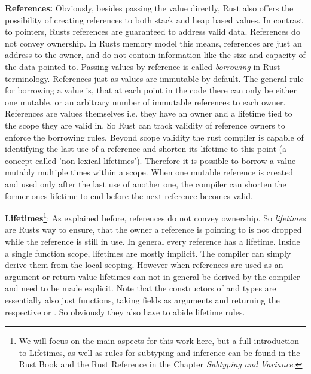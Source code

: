\textbf{References:} Obviously, besides passing the value directly, Rust also offers the possibility of creating references to both stack and heap based values. In contrast to pointers, Rusts references are guaranteed to address valid data. References do not convey ownership. In Rusts memory model this means, references are just an address to the owner, and do not contain information like the size and capacity of the data pointed to. Passing values by reference is called \emph{borrowing} in Rust terminology. References just as  values are immutable by default. The general rule for borrowing a value is, that at each point in the code there can only be either one mutable, or an arbitrary number of immutable references to each owner. References are values themselves i.e. they have an owner and a lifetime tied to the scope they are valid in. So Rust can track validity of reference owners to enforce the borrowing rules. Beyond scope validity the rust compiler is capable of identifying the last use of a reference and shorten its lifetime to this point (a concept called 'non-lexical lifetimes'). Therefore it is possible to borrow a value mutably multiple times within a scope. When one mutable reference is created and used only after the last use of another one, the compiler can shorten the former ones lifetime to end before the next reference becomes valid. 

\textbf{Lifetimes}\footnote{ We will focus on the main aspects for this work here, but a full introduction to Lifetimes, as well as rules for subtyping and inference can be found in the Rust Book\cite{rustbook} and the Rust Reference\cite{rustreference} in the Chapter \emph{Subtyping and Variance}.}: As explained before, references do not convey ownership. So \emph{lifetimes} are Rusts way to ensure, that the owner a reference is pointing to is not dropped while the reference is still in use. 
In general every reference has a lifetime. Inside a single function scope, lifetimes are mostly implicit. The compiler can simply derive them from the local scoping. However when references are used as an argument or return value lifetimes can not in general be derived by the compiler and need to be made explicit. Note that the constructors of  and  types are essentially also just functions, taking fields as arguments and returning the respective  or . So obviously they also have to abide lifetime rules. 

